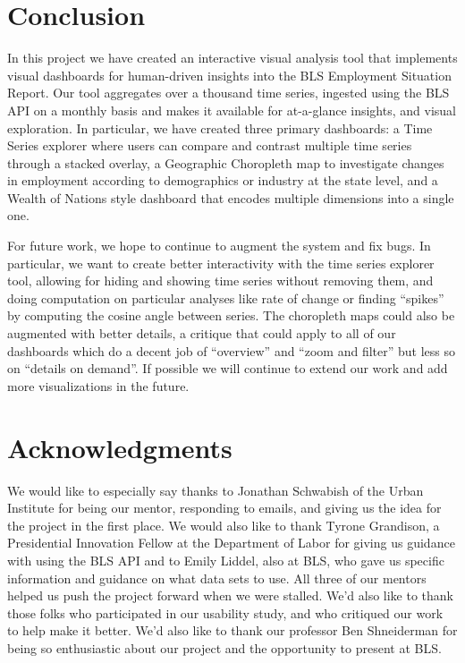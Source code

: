 \documentclass{sigchi}
\begin{document}
\section{Conclusion}

In this project we have created an interactive visual analysis tool that implements visual dashboards for human-driven insights into the BLS Employment Situation Report. Our tool aggregates over a thousand time series, ingested using the BLS API on a monthly basis and makes it available for at-a-glance insights, and visual exploration. In particular, we have created three primary dashboards: a Time Series explorer where users can compare and contrast multiple time series through a stacked overlay, a Geographic Choropleth map to investigate changes in employment according to demographics or industry at the state level, and a Wealth of Nations style dashboard that encodes multiple dimensions into a single one.

For future work, we hope to continue to augment the system and fix bugs. In particular, we want to create better interactivity with the time series explorer tool, allowing for hiding and showing time series without removing them, and doing computation on particular analyses like rate of change or finding ``spikes'' by computing the cosine angle between series. The choropleth maps could also be augmented with better details, a critique that could apply to all of our dashboards which do a decent job of ``overview'' and ``zoom and filter'' but less so on ``details on demand''. If possible we will continue to extend our work and add more visualizations in the future.

\section{Acknowledgments}

We would like to especially say thanks to Jonathan Schwabish of the Urban Institute for being our mentor, responding to emails, and giving us the idea for the project in the first place. We would also like to thank Tyrone Grandison, a Presidential Innovation Fellow at the Department of Labor for giving us guidance with using the BLS API and to Emily Liddel, also at BLS, who gave us specific information and guidance on what data sets to use. All three of our mentors helped us push the project forward when we were stalled. We'd also like to thank those folks who participated in our usability study, and who critiqued our work to help make it better. We'd also like to thank our professor Ben Shneiderman for being so enthusiastic about our project and the opportunity to present at BLS.
\end{document}
